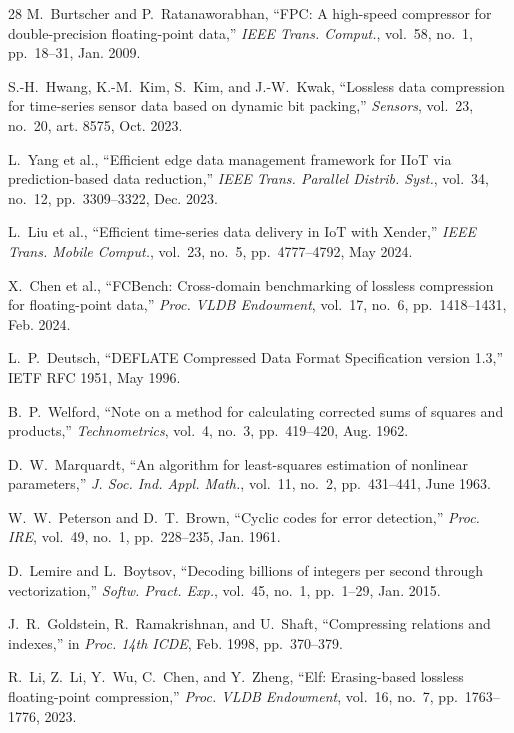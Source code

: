 \documentclass[runningheads]{llncs}
\begin{document}
\begin{thebibliography}{28}
M.~Burtscher and P.~Ratanaworabhan, ``FPC: A high-speed compressor for double-precision floating-point data,'' \emph{IEEE Trans. Comput.}, vol.~58, no.~1, pp.~18--31, Jan. 2009.

S.-H.~Hwang, K.-M.~Kim, S.~Kim, and J.-W.~Kwak, ``Lossless data compression for time-series sensor data based on dynamic bit packing,'' \emph{Sensors}, vol.~23, no.~20, art. 8575, Oct. 2023.

L.~Yang et al., ``Efficient edge data management framework for IIoT via prediction-based data reduction,'' \emph{IEEE Trans. Parallel Distrib. Syst.}, vol.~34, no.~12, pp.~3309--3322, Dec. 2023.

L.~Liu et al., ``Efficient time-series data delivery in IoT with Xender,'' \emph{IEEE Trans. Mobile Comput.}, vol.~23, no.~5, pp.~4777--4792, May 2024.

X.~Chen et al., ``FCBench: Cross-domain benchmarking of lossless compression for floating-point data,'' \emph{Proc. VLDB Endowment}, vol.~17, no.~6, pp.~1418--1431, Feb. 2024.

L.~P.~Deutsch, ``DEFLATE Compressed Data Format Specification version 1.3,'' IETF RFC 1951, May 1996.

B.~P.~Welford, ``Note on a method for calculating corrected sums of squares and products,'' \emph{Technometrics}, vol.~4, no.~3, pp.~419--420, Aug. 1962.

D.~W.~Marquardt, ``An algorithm for least-squares estimation of nonlinear parameters,'' \emph{J. Soc. Ind. Appl. Math.}, vol.~11, no.~2, pp.~431--441, June 1963.

W.~W.~Peterson and D.~T.~Brown, ``Cyclic codes for error detection,'' \emph{Proc. IRE}, vol.~49, no.~1, pp.~228--235, Jan. 1961.

D.~Lemire and L.~Boytsov, ``Decoding billions of integers per second through vectorization,'' \emph{Softw. Pract. Exp.}, vol.~45, no.~1, pp.~1--29, Jan. 2015.

J.~R.~Goldstein, R.~Ramakrishnan, and U.~Shaft, ``Compressing relations and indexes,'' in \emph{Proc. 14th ICDE}, Feb. 1998, pp.~370--379.

R.~Li, Z.~Li, Y.~Wu, C.~Chen, and Y.~Zheng, ``Elf: Erasing-based lossless floating-point compression,'' \emph{Proc. VLDB Endowment}, vol.~16, no.~7, pp.~1763--1776, 2023.


\end{thebibliography}
\end{document}

